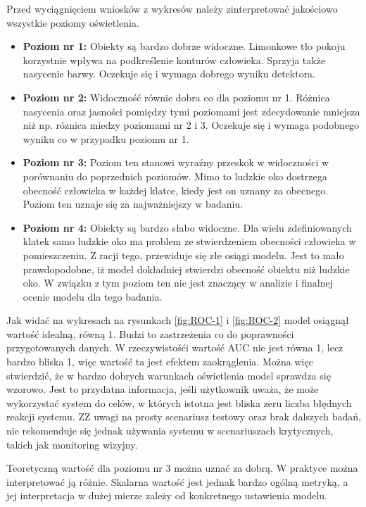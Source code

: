 Przed wyciągnięciem wniosków z wykresów należy zinterpretować jakościowo wszystkie poziomy oświetlenia. 
\begin{itemize}
    \item \textbf{Poziom nr 1:} Obiekty są bardzo dobrze widoczne. Limonkowe tło pokoju korzystnie wpływa na podkreślenie konturów człowieka. Sprzyja także nasycenie barwy. Oczekuje się i wymaga dobrego wyniku detektora. 
    \item \textbf{Poziom nr 2:} Widoczność równie dobra co dla poziomu nr 1. Różnica nasycenia oraz jasności pomiędzy tymi poziomami jest zdecydowanie mniejsza niż np. róznica miedzy poziomami nr 2 i 3. Oczekuje się i wymaga podobnego wyniku co w przypadku poziomu nr 1.
    \item \textbf{Poziom nr 3:} Poziom ten stanowi wyraźny przeskok w widoczności w porównaniu do poprzednich poziomów. Mimo to ludzkie oko dostrzega obecność człowieka w każdej klatce, kiedy jest on uznany za obecnego. Poziom ten uznaje się za najważniejszy w badaniu.
    \item \textbf{Poziom nr 4:} Obiekty są bardzo słabo widoczne. Dla wielu zdefiniowanych klatek samo ludzkie oko ma problem ze stwierdzeniem obecności człowieka w pomieszczeniu. Z racji tego, przewiduje się złe osiągi modelu. Jest to mało prawdopodobne, iż model dokładniej stwierdzi obecność obiektu niż ludzkie oko. W związku z tym poziom ten nie jest znaczący w analizie i finalnej ocenie modelu dla tego badania. 
\end{itemize}

Jak widać na wykresach na rysunkach \ref{fig:ROC-1} i \ref{fig:ROC-2} model osiągnął wartość idealną, równą 1. Budzi to zastrzeżenia co do poprawności przygotowanych danych. W rzeczywistośći wartość AUC nie jest równa 1, lecz bardzo bliska 1, więc wartość ta jest efektem zaokrąglenia. Można więc stwierdzić, że w bardzo dobrych warunkach oświetlenia model sprawdza się wzorowo. Jest to przydatna informacja, jeśli użytkownik uważa, że może wykorzystać system do celów, w których istotna jest bliska zeru liczba błędnych reakcji systemu. ZZ uwagi na prosty scenariusz testowy oraz brak dalszych badań, nie rekomenduje się jednak używania systemu w scenariuszach krytycznych, takich jak monitoring wizyjny.

Teoretyczną wartość dla poziomu nr 3 można uznać za dobrą. W praktyce można interpretować ją różnie. Skalarna wartość jest jednak bardzo ogólną metryką, a jej interpretacja w dużej mierze zależy od konkretnego ustawienia modelu. 

